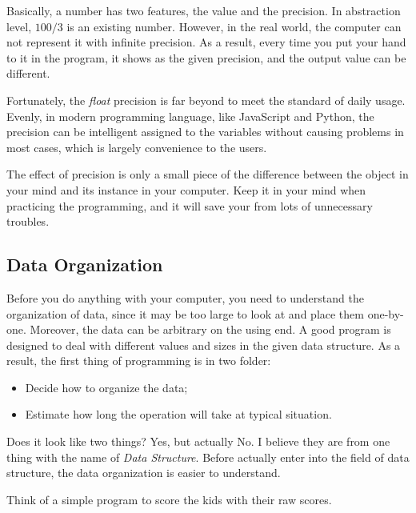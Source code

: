 Basically, a number has two features, the value and the precision.
In abstraction level, $100/3$ is an existing number.
However, in the real world, the computer can not represent it with infinite precision.
As a result, every time you put your hand to it in the program,
it shows as the given precision, and the output value can be different.



Fortunately, the \emph{float} precision is far beyond to meet the standard of daily usage.
Evenly, in modern programming language, like JavaScript and Python,
the precision can be intelligent assigned to the variables without causing problems in most cases,
which is largely convenience to the users.

The effect of precision is only a small piece of the difference between the object in your mind and its instance in your computer.
Keep it in your mind when practicing the programming, and it will save your from lots of unnecessary troubles.

\subsection{Data Organization}

Before you do anything with your computer,
you need to understand the organization of data,
since it may be too large to look at and place them one-by-one.
Moreover, the data can be arbitrary on the using end.
A good program is designed to deal with different values and sizes in the given data structure.
As a result, the first thing of programming is in two folder:
\begin{itemize}
    \item Decide how to organize the data;
    \item Estimate how long the operation will take at typical situation.
\end{itemize}
Does it look like two things?
Yes, but actually No.
I believe they are from one thing with the name of \emph{Data Structure}.
Before actually enter into the field of data structure, the data organization is easier to understand.

Think of a simple program to score the kids with their raw scores.




